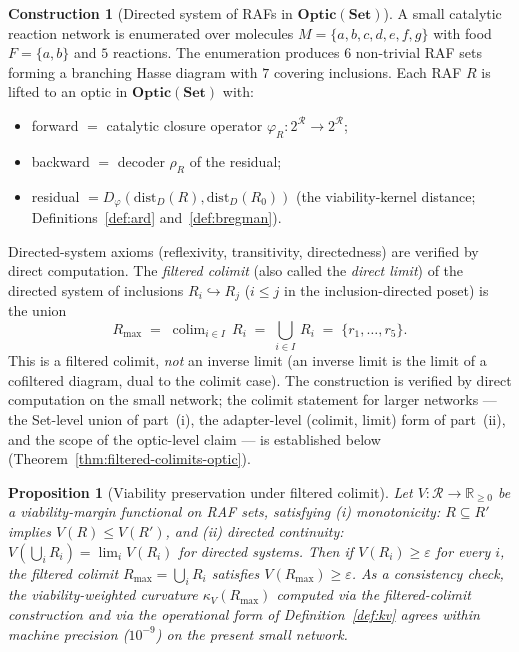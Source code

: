 \documentclass[11pt,a4paper]{article}
\theoremstyle{plain}
\newtheorem{proposition}[theorem]{Proposition}
\theoremstyle{definition}
\newtheorem{construction}[theorem]{Construction}
\theoremstyle{remark}
\newcommand{\kk}{\kappa_{\!V}}
\newcommand{\RR}{\mathbb{R}}
\newcommand{\Optic}{\mathbf{Optic}}
\newcommand{\colim}{\operatorname{colim}}
\begin{document}
\begin{construction}[Directed system of RAFs in $\Optic(\mathbf{Set})$]
\label{con:invlim}
A small catalytic reaction network is enumerated over molecules
$M = \{a,b,c,d,e,f,g\}$ with food $F = \{a,b\}$ and $5$ reactions. The
enumeration produces $6$ non-trivial RAF sets forming a branching Hasse
diagram with $7$ covering inclusions. Each RAF $R$ is lifted to an
optic in $\Optic(\mathbf{Set})$ with:
\begin{itemize}[leftmargin=1.2em,itemsep=1pt]
\item forward $=$ catalytic closure operator $\varphi_R:
2^{\mathcal{R}}\to 2^{\mathcal{R}}$;
\item backward $=$ decoder $\rho_R$ of the residual;
\item residual $= D_\varphi(\mathrm{dist}_D(R), \mathrm{dist}_D(R_0))$
(the viability-kernel distance; Definitions~\ref{def:ard}
and~\ref{def:bregman}).
\end{itemize}
Directed-system axioms (reflexivity, transitivity, directedness) are
verified by direct computation. The \emph{filtered colimit} (also
called the \emph{direct limit}) of the directed system of inclusions
$R_i \hookrightarrow R_j$ ($i \leq j$ in the inclusion-directed
poset) is the union
\begin{equation}\label{eq:rmax-colim}
  R_{\max} \;=\; \colim_{i\in I}\, R_i \;=\; \bigcup_{i\in I}\, R_i
  \;=\; \{r_1, \ldots, r_5\}.
\end{equation}
This is a filtered colimit, \emph{not} an inverse limit (an inverse
limit is the limit of a cofiltered diagram, dual to the colimit case).
The construction is verified by direct computation on the small
network; the colimit statement for larger networks --- the Set-level
union of part~(i), the adapter-level (colimit, limit) form of
part~(ii), and the scope of the optic-level claim --- is established
below (Theorem~\ref{thm:filtered-colimits-optic}).
\end{construction}

\begin{proposition}[Viability preservation under filtered colimit]
\label{prop:invlim}
Let $V : \mathcal R \to \RR_{\geq 0}$ be a viability-margin functional
on RAF sets, satisfying (i) \emph{monotonicity}: $R \subseteq R'$
implies $V(R) \leq V(R')$, and (ii) \emph{directed continuity}:
$V(\bigcup_i R_i) = \lim_i V(R_i)$ for directed systems. Then if
$V(R_i) \geq \varepsilon$ for every $i$, the filtered colimit
$R_{\max} = \bigcup_i R_i$ satisfies $V(R_{\max}) \geq \varepsilon$.
As a consistency check, the viability-weighted curvature
$\kk(R_{\max})$ computed via the filtered-colimit construction and
via the operational form of Definition~\ref{def:kv} agrees within
machine precision ($10^{-9}$) on the present small network.
\end{proposition}
\end{document}
